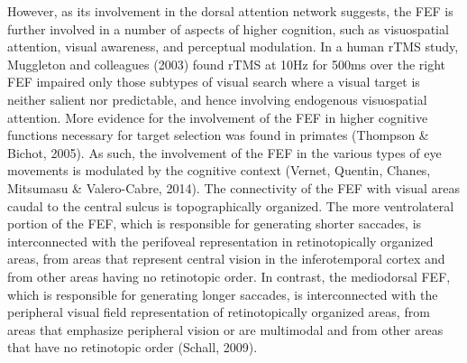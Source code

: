 \documentclass[a4paper, 11pt]{scrreprt}
\begin{document}
However, as its involvement in the dorsal attention network suggests, the FEF is further involved in a number of aspects of higher cognition, such as visuospatial attention, visual awareness, and perceptual modulation.  In a human rTMS study, Muggleton and colleagues (2003) found rTMS at 10Hz for 500ms over the right FEF impaired only those subtypes of visual search where a visual target is neither salient nor predictable, and hence involving endogenous visuospatial attention. More evidence for the involvement of the FEF in higher cognitive functions necessary for target selection was found in primates (Thompson \& Bichot, 2005). \newline
As such, the involvement of the FEF in the various types of eye movements is modulated by the cognitive context (Vernet, Quentin, Chanes, Mitsumasu \& Valero-Cabre, 2014).
The connectivity of the FEF with visual areas caudal to the central sulcus is topographically organized. The more ventrolateral portion of the FEF, which is responsible for generating shorter saccades, is interconnected with the perifoveal representation in retinotopically organized areas, from areas that represent central vision in the inferotemporal cortex and from other areas having no retinotopic order. In contrast, the mediodorsal FEF, which is responsible for generating longer saccades, is interconnected with the peripheral visual field representation of retinotopically organized areas, from areas that emphasize peripheral vision or are multimodal and from other areas that have no retinotopic order (Schall, 2009).
\end{document}

